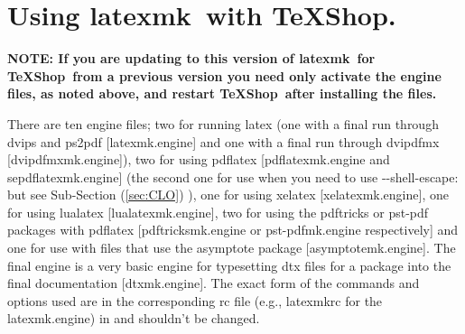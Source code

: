 \documentclass[11pt]{article}
\newcommand{\cmd}[1]{\textsf{#1}}
\newcommand{\TS}{\textsf{\TeX Shop}}
\newcommand{\latexmk}{\textsf{latexmk}}
\begin{document}
\section{Using \latexmk\ with \TS.}

\textbf{NOTE: If you are updating to this version of \latexmk\ for \TS\ from a previous version you need only activate the engine files, as noted above, and restart \TS\ after installing the files.}

There are ten \cmd{engine} files; two for running \cmd{latex} (one with a final run through \cmd{dvips} and \cmd{ps2pdf} [\cmd{latexmk.engine}] and one with a final run through \cmd{dvipdfmx} [\cmd{dvipdfmxmk.engine]}), two for using \cmd{pdflatex} [\cmd{pdflatexmk.engine} and \cmd{sepdflatexmk.engine}] (the second one for use when you need to use \cmd{-{}-shell-escape}: but see Sub-Section (\ref{sec:CLO}) ), one for using \cmd{xelatex} [\cmd{xelatexmk.engine}], one for using \cmd{lualatex} [\cmd{lualatexmk.engine}], two for using the \cmd{pdftricks} or \cmd{pst-pdf} packages with \cmd{pdflatex} [\cmd{pdftricksmk.engine} or \cmd{pst-pdfmk.engine} respectively] and one for use with files that use the \cmd{asymptote} package [\cmd{asymptotemk.engine}]. The final engine is a very basic engine for typesetting \cmd{dtx} files for a package into the final documentation [\cmd{dtxmk.engine}]. The exact form of the commands and options used are in the corresponding \cmd{rc} file (e.g., \cmd{latexmkrc} for the \cmd{latexmk.engine}) in  and shouldn't be changed.
\end{document}
